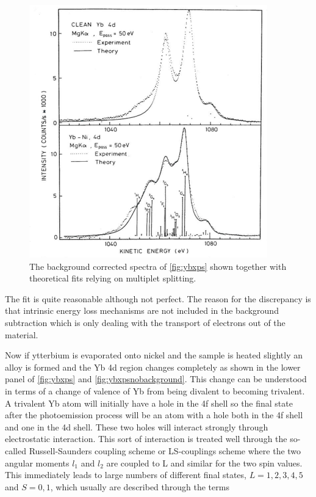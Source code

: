 \begin{figure}[h!]
	\begin{center}
	\includegraphics[scale=4]{figures/04_11.png}
	\caption{The background corrected spectra of \autoref{fig:ybxps} shown together with theoretical fits relying on multiplet splitting.}
	\label{fig:ybxpsnobackground}
	\end{center}
\end{figure}

The fit is quite reasonable although not perfect. The reason for the discrepancy is that intrinsic energy loss mechanisms are not included in the background subtraction which is only dealing with the transport of electrons out of the material.

Now if ytterbium is evaporated onto nickel and the sample is heated slightly an alloy is formed and the Yb 4d region changes completely as shown in the lower panel of \autoref{fig:ybxps} and \autoref{fig:ybxpsnobackground}. This change can be understood in terms of a change of valence of Yb from being divalent to becoming trivalent. A trivalent Yb atom will initially have a hole in the 4f shell so the final state after the photoemission process will be an atom with a hole both in the 4f shell and one in the 4d shell. These two holes will interact strongly through electrostatic interaction. This sort of interaction is treated well through the so-called Russell-Saunders coupling scheme or LS-couplings scheme where the two angular moments $l_1$ and $l_2$ are coupled to L and similar for the two spin values. This immediately leads to large numbers of different final states, $L=1,2,3,4,5$ and $S=0,1$, which usually are described through the terms

